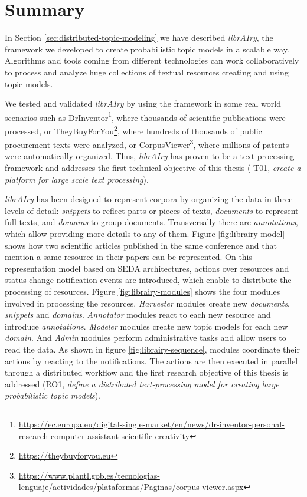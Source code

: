 \section{Summary}

In Section \ref{sec:distributed-topic-modeling} we have described \textit{librAIry}, the framework we developed to create probabilistic topic models in a scalable way. Algorithms and tools coming from different technologies can work collaboratively to process and analyze huge collections of textual resources creating and using topic models. 

We tested and validated \textit{librAIry} by using the framework in some real world scenarios such as DrInventor\footnote{\url{https://ec.europa.eu/digital-single-market/en/news/dr-inventor-personal-research-computer-assistant-scientific-creativity}}, where thousands of scientific publications were processed, or TheyBuyForYou\footnote{\url{https://theybuyforyou.eu}}, where hundreds of thousands of public procurement texts were analyzed, or 
CorpusViewer\footnote{\url{https://www.plantl.gob.es/tecnologias-lenguaje/actividades/plataformas/Paginas/corpus-viewer.aspx}}, where millions of patents were automatically organized. Thus, \textit{librAIry} has proven to be a text processing framework and addresses the first technical objective of this thesis ( T01, \textit{create a platform for large scale text processing}).

\textit{librAIry} has been designed to represent corpora by organizing the data in three levels of detail: \textit{snippets} to reflect parts or pieces of texts, \textit{documents} to represent full texts, and \textit{domains} to group documents. Transversally there are \textit{annotations}, which allow providing more details to any of them. Figure \ref{fig:librairy-model} shows how two scientific articles published in the same conference and that mention a same resource in their papers can be represented. On this representation model based on SEDA architectures, actions over resources and status change notification events are introduced, which enable to distribute the processing of resources. Figure \ref{fig:librairy-modules} shows the four modules involved in processing the resources. \textit{Harvester} modules create new \textit{documents}, \textit{snippets} and \textit{domains}. \textit{Annotator} modules react to each new resource and introduce \textit{annotations}. \textit{Modeler} modules create new topic models for each new \textit{domain}. And \textit{Admin} modules perform administrative tasks and allow users to read the data. As shown in figure \ref{fig:librairy-sequence}, modules coordinate their actions by reacting to the notifications. The actions are then executed in parallel through a distributed workflow and the first research objective of this thesis is addressed (RO1, \textit{define a distributed text-processing model for creating large probabilistic topic models}).

